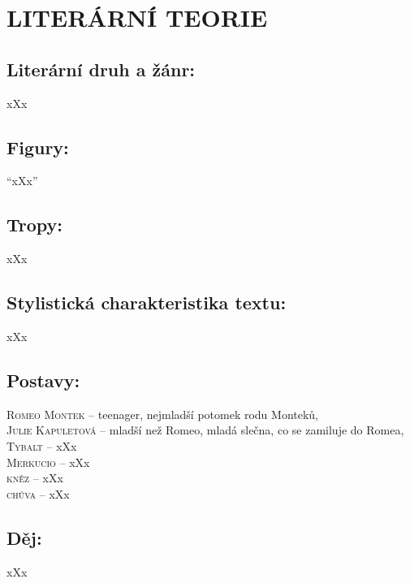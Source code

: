 \documentclass{extarticle} %
\begin{document}
\section*{LITERÁRNÍ TEORIE}

\subsection*{Literární druh a žánr:}
\noindent xXx



\subsection*{Figury:}
\noindent 
\enquote{xXx}

\subsection*{Tropy:}
\noindent 
xXx

\subsection*{Stylistická charakteristika textu:}
\noindent 
xXx

\subsection*{Postavy:}
\noindent 
\textsc{Romeo Montek --} teenager, nejmladší potomek rodu Monteků,  \\
\textsc{Julie Kapuletová --} mladší než Romeo, mladá slečna, co se zamiluje do Romea, \\
\textsc{Tybalt --} xXx \\
\textsc{Merkucio --} xXx \\
\textsc{kněz --} xXx \\
\textsc{chůva --} xXx

\subsection*{Děj:}
\noindent 
xXx
\end{document}
